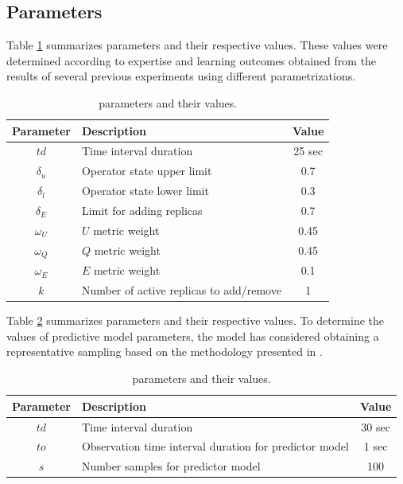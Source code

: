 \subsection{Parameters}
\label{exp:params}
Table \ref{tab:exp-reactive-parameters} summarizes \rSPS{} parameters and their respective values. These values were determined according to expertise and learning outcomes obtained from the results of several previous experiments using different parametrizations.

\begin{table}[!ht]
\centering
\begin{tabular}{|c|l|c|}
\hline
Parameter     & Description & Value
\\ \hline \hline
$td$          & Time interval duration & 25 sec  \\ \hline
$\delta_{u}$    & Operator state upper limit & 0.7     \\ \hline
$\delta_{l}$    & Operator state lower limit   & 0.3     \\ \hline
$\delta_{E}$    & Limit for adding replicas  & 0.7     \\ \hline
$\omega_U$    &  $U$ metric weight & 0.45    \\ \hline
$\omega_Q$    & $Q$ metric weight & 0.45    \\ \hline
$\omega_E$    & $E$ metric weight & 0.1     \\ \hline
$k$  		  & Number of active replicas to add/remove & 1       \\ \hline
\end{tabular}
\caption{\rSPS{} parameters and their values.}
\label{tab:exp-reactive-parameters}
\end{table}

Table \ref{tab:exp-predictive-parameters} summarizes \pSPS{} parameters and their respective values. To determine the values of predictive model parameters, the model has considered obtaining a representative sampling based on the methodology presented in \citep{winters2017practical}.

\begin{table}[!ht]
\centering
\begin{tabular}{|c|l|c|}
\hline
Parameter     & Description & Value
\\ \hline \hline
$td$   & Time interval duration    							    & 30 sec  \\ \hline
$to$   & Observation time interval duration for predictor model & 1 sec    \\ \hline
$s$    & Number samples for predictor model     				& 100  \\ \hline
\end{tabular}
\caption{\pSPS{} parameters and their values.}
\label{tab:exp-predictive-parameters}
\end{table}

